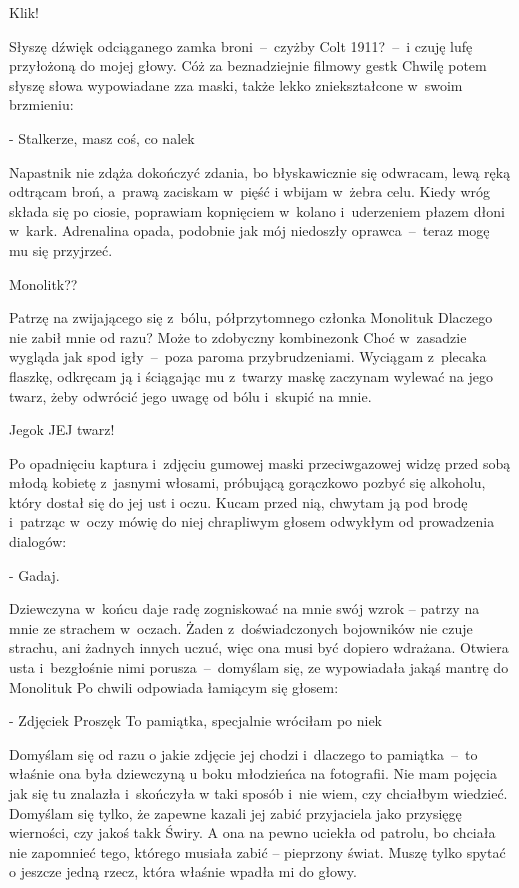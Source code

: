 \documentclass[../MAIN.tex]{subfiles}
\begin{document}
Klik!

Słyszę dźwięk odciąganego zamka broni~--~czyżby Colt 1911?~--~i
czuję lufę przyłożoną do mojej głowy. Cóż za beznadziejnie
filmowy gest\3k Chwilę potem słyszę słowa wypowiadane zza
maski,
także lekko zniekształcone w~swoim brzmieniu:

- Stalkerze, masz coś, co nale\3k

Napastnik nie zdąża dokończyć zdania, bo błyskawicznie się
odwracam, lewą ręką odtrącam broń, a~prawą zaciskam w~pięść i
wbijam w~żebra celu. Kiedy wróg składa się po ciosie, poprawiam
kopnięciem w~kolano i~uderzeniem płazem dłoni w~kark.
Adrenalina opada, podobnie jak mój niedoszły oprawca~--~teraz
mogę mu się przyjrzeć.

Monolit\3k??

Patrzę na zwijającego się z~bólu, półprzytomnego członka
Monolitu\3k Dlaczego nie zabił mnie od razu? Może to zdobyczny
kombinezon\3k Choć w~zasadzie wygląda jak spod igły~--~poza
paroma
przybrudzeniami. Wyciągam z~plecaka flaszkę, odkręcam ją i
ściągając mu z~twarzy maskę zaczynam wylewać na jego twarz,
żeby odwrócić jego uwagę od bólu i~skupić na mnie.

Jego\3k JEJ twarz!

Po opadnięciu kaptura i~zdjęciu gumowej maski przeciwgazowej
widzę przed sobą młodą kobietę z~jasnymi włosami, próbującą
gorączkowo pozbyć się alkoholu, który dostał się do jej ust i
oczu. Kucam przed nią, chwytam ją pod brodę i~patrząc w~oczy
mówię do niej chrapliwym głosem odwykłym od prowadzenia
dialogów:

- Gadaj.

Dziewczyna w~końcu daje radę zogniskować na mnie swój wzrok –
patrzy na mnie ze strachem w~oczach. Żaden z~doświadczonych
bojowników nie czuje strachu, ani żadnych innych uczuć, więc
ona musi być dopiero wdrażana. Otwiera usta i~bezgłośnie nimi
porusza~--~domyślam się, ze wypowiadała jakąś mantrę do
Monolitu\3k Po chwili odpowiada łamiącym się głosem:

- Zdjęcie\3k Proszę\3k To pamiątka, specjalnie wróciłam po
nie\3k

Domyślam się od razu o jakie zdjęcie jej chodzi i~dlaczego to
pamiątka~--~to właśnie ona była dziewczyną u boku młodzieńca na
fotografii. Nie mam pojęcia jak się tu znalazła i~skończyła w
taki sposób i~nie wiem, czy chciałbym wiedzieć. Domyślam się
tylko, że zapewne kazali jej zabić przyjaciela jako przysięgę
wierności, czy jakoś tak\3k Świry. A ona na pewno uciekła od
patrolu, bo chciała nie zapomnieć tego, którego musiała zabić –
pieprzony świat. Muszę tylko spytać o jeszcze jedną rzecz,
która właśnie wpadła mi do głowy.
\end{document}
